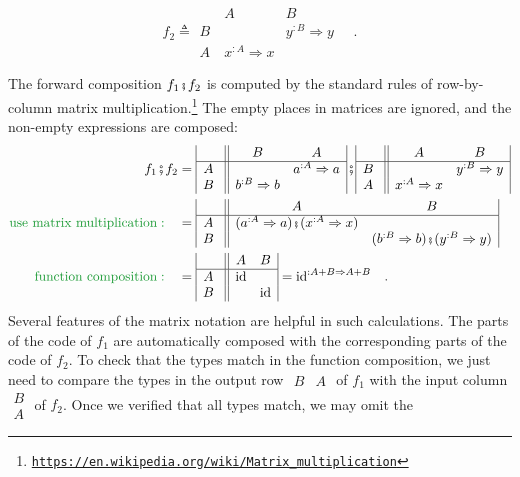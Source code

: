 \vspace{-1.3\baselineskip}
\[
f_{2}\triangleq\begin{array}{|c||cc|}
 & A & B\\
\hline B~ &  & y^{:B}\Rightarrow y\\
A~ & x^{:A}\Rightarrow x & 
\end{array}\quad.
\]
\vspace{-1\baselineskip}

The forward composition $f_{1}\bef f_{2}$ is computed by the standard
rules of row-by-column matrix multiplication.\footnote{\texttt{\href{https://en.wikipedia.org/wiki/Matrix_multiplication}{https://en.wikipedia.org/wiki/Matrix\_multiplication}}}
The empty places in matrices are ignored, and the non-empty expressions
are composed:
\begin{align*}
f_{1}\bef f_{2} & =\begin{array}{|c||cc|}
 & B & A\\
\hline A~ &  & a^{:A}\Rightarrow a\\
B~ & b^{:B}\Rightarrow b & 
\end{array}\bef\begin{array}{|c||cc|}
 & A & B\\
\hline B~ &  & y^{:B}\Rightarrow y\\
A~ & x^{:A}\Rightarrow x & 
\end{array}\\
{\color{greenunder}\text{use matrix multiplication}:}\quad & =\begin{array}{|c||cc|}
 & A & B\\
\hline A~ & (a^{:A}\Rightarrow a)\bef(x^{:A}\Rightarrow x) & \\
B~ &  & (b^{:B}\Rightarrow b)\bef(y^{:B}\Rightarrow y)
\end{array}\\
{\color{greenunder}\text{function composition}:}\quad & =\begin{array}{|c||cc|}
 & A & B\\
\hline A~ & \text{id} & \\
B~ &  & \text{id}
\end{array}=\text{id}^{:A+B\Rightarrow A+B}\quad.
\end{align*}
Several features of the matrix notation are helpful in such calculations.
The parts of the code of $f_{1}$ are automatically composed with
the corresponding parts of the code of $f_{2}$. To check that the
types match in the function composition, we just need to compare the
types in the output row $\begin{array}{||cc|}
B & A\end{array}$ of $f_{1}$ with the input column $\begin{array}{|c||}
B\\
A
\end{array}$ of $f_{2}$. Once we verified that all types match, we may omit the
